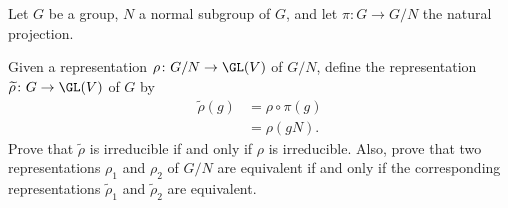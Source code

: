 \documentclass[10pt]{mypackage}
\begin{document}
\RaggedRight
\begin{problem}[Problem 1]
  Let $G$ be a group, $N$ a normal subgroup of $G$, and let $\pi\colon G\rightarrow G/N$ the natural projection.

  Given a representation $\rho\colon G/N\rightarrow \GL(V)$ of $G/N$, define the representation $ \widetilde{\rho}\colon G\rightarrow \GL(V) $ of $G$ by
  \begin{align*}
    \widetilde{\rho}(g) &= \rho\circ \pi\left( g \right)\\
                        &= \rho\left( gN \right).
  \end{align*}
  Prove that $\widetilde{\rho}$ is irreducible if and only if $\rho$ is irreducible. Also, prove that two representations $\rho_1$ and $\rho_2$ of $G/N$ are equivalent if and only if the corresponding representations $\widetilde{\rho}_1$ and $\widetilde{\rho}_2$ are equivalent.
\end{problem}
\end{document}
